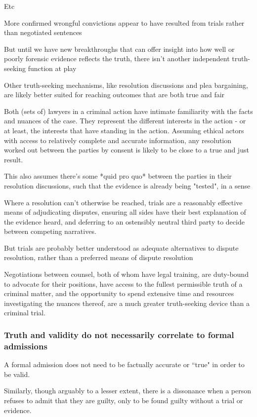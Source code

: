 Etc

More confirmed wrongful convictions appear to have resulted from trials rather than negotiated sentences

But until we have new breakthroughs that can offer insight into how well or poorly forensic evidence reflects the truth, there isn't another independent truth-seeking function at play

Other truth-seeking mechanisms, like resolution discussions and plea bargaining, are likely better suited for reaching outcomes that are both true and fair

Both (sets of) lawyers in a criminal action have intimate familiarity with the facts and nuances of the case. They represent the different interests in the action - or at least, the interests that have standing in the action. Assuming ethical actors with access to relatively complete and accurate information, any resolution worked out between the parties by consent is likely to be close to a true and just result.

This also assumes there's some *quid pro quo* between the parties in their resolution discussions, such that the evidence is already being "tested", in a sense

Where a resolution can't otherwise be reached, trials are a reasonably effective means of adjudicating disputes, ensuring all sides have their best explanation of the evidence heard, and deferring to an ostensibly neutral third party to decide between competing narratives.

But trials are probably better understood as adequate alternatives to dispute resolution, rather than a preferred means of dispute resolution

Negotiations between counsel, both of whom have legal training, are duty-bound to advocate for their positions, have access to the fullest permissible truth of a criminal matter, and the opportunity to spend extensive time and resources investigating the nuances thereof, are a much greater truth-seeking device than a criminal trial.

\subsubsection{Truth and validity do not necessarily correlate to formal admissions}

A formal admission does not need to be factually accurate or ``true" in order to be valid. 

Similarly, though arguably to a lesser extent, there is a dissonance when a person refuses to admit that they are guilty, only to be found guilty without a trial or evidence.

